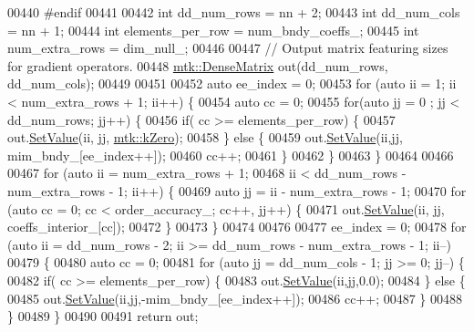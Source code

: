 \begin{DoxyCode}
{{00440 \textcolor{preprocessor}{  #endif}
00441 
00442   \textcolor{keywordtype}{int} dd\_num\_rows = nn + 2;
00443   \textcolor{keywordtype}{int} dd\_num\_cols = nn + 1;
00444   \textcolor{keywordtype}{int} elements\_per\_row = num\_bndy\_coeffs\_;
00445   \textcolor{keywordtype}{int} num\_extra\_rows = dim\_null\_;
00446 
00447   \textcolor{comment}{// Output matrix featuring sizes for gradient operators.}
00448   \hyperlink{classmtk_1_1DenseMatrix}{mtk::DenseMatrix} out(dd\_num\_rows, dd\_num\_cols);
00449 
00451 
00452   \textcolor{keyword}{auto} ee\_index = 0;
00453   \textcolor{keywordflow}{for} (\textcolor{keyword}{auto} ii = 1; ii < num\_extra\_rows + 1; ii++) \{
00454     \textcolor{keyword}{auto} cc = 0;
00455     \textcolor{keywordflow}{for}(\textcolor{keyword}{auto} jj = 0 ; jj < dd\_num\_rows; jj++) \{
00456       \textcolor{keywordflow}{if}( cc >= elements\_per\_row) \{
00457         out.\hyperlink{classmtk_1_1DenseMatrix_a784ce5784109ac86bfb9d8562b334b13}{SetValue}(ii, jj, \hyperlink{group__c01-roots_ga59a451a5fae30d59649bcda274fea271}{mtk::kZero});
00458       \} \textcolor{keywordflow}{else} \{
00459         out.\hyperlink{classmtk_1_1DenseMatrix_a784ce5784109ac86bfb9d8562b334b13}{SetValue}(ii,jj, mim\_bndy\_[ee\_index++]);
00460         cc++;
00461       \}
00462     \}
00463   \}
00464 
00466 
00467   \textcolor{keywordflow}{for} (\textcolor{keyword}{auto} ii = num\_extra\_rows + 1;
00468        ii < dd\_num\_rows - num\_extra\_rows - 1; ii++) \{
00469     \textcolor{keyword}{auto} jj = ii - num\_extra\_rows - 1;
00470     \textcolor{keywordflow}{for} (\textcolor{keyword}{auto} cc = 0; cc < order\_accuracy\_; cc++, jj++) \{
00471       out.\hyperlink{classmtk_1_1DenseMatrix_a784ce5784109ac86bfb9d8562b334b13}{SetValue}(ii, jj, coeffs\_interior\_[cc]);
00472     \}
00473   \}
00474 
00476 
00477   ee\_index = 0;
00478   \textcolor{keywordflow}{for} (\textcolor{keyword}{auto} ii = dd\_num\_rows - 2; ii >= dd\_num\_rows - num\_extra\_rows - 1; ii--)
00479   \{
00480     \textcolor{keyword}{auto} cc = 0;
00481     \textcolor{keywordflow}{for} (\textcolor{keyword}{auto} jj = dd\_num\_cols - 1; jj >= 0; jj--) \{
00482       \textcolor{keywordflow}{if}( cc >= elements\_per\_row) \{
00483         out.\hyperlink{classmtk_1_1DenseMatrix_a784ce5784109ac86bfb9d8562b334b13}{SetValue}(ii,jj,0.0);
00484       \} \textcolor{keywordflow}{else} \{
00485         out.\hyperlink{classmtk_1_1DenseMatrix_a784ce5784109ac86bfb9d8562b334b13}{SetValue}(ii,jj,-mim\_bndy\_[ee\_index++]);
00486         cc++;
00487       \}
00488      \}
00489   \}
00490 
00491   \textcolor{keywordflow}{return} out;
}}
\end{DoxyCode}
